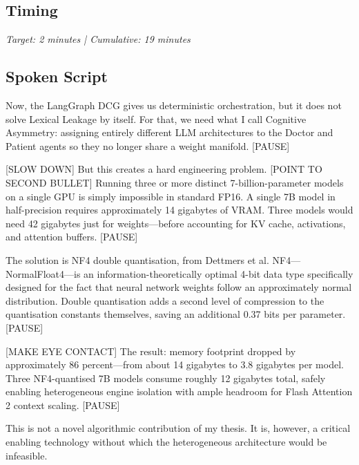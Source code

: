 \documentclass[12pt]{article}
\begin{document}
  \subsection*{Timing}
  \textit{Target: 2 minutes | Cumulative: 19 minutes}

  \subsection*{Spoken Script}
  \begin{spokenbox}
   Now, the LangGraph DCG gives us deterministic orchestration, but it does not solve Lexical Leakage by itself. For that, we need what I call Cognitive Asymmetry: assigning entirely different LLM architectures to the Doctor and Patient agents so they no longer share a weight manifold. [PAUSE]

  [SLOW DOWN] But this creates a hard engineering problem. [POINT TO SECOND BULLET] Running three or more distinct 7-billion-parameter models on a single GPU is simply impossible in standard FP16. A single 7B model in half-precision requires approximately 14 gigabytes of VRAM. Three models would need 42 gigabytes just for weights---before accounting for KV cache, activations, and attention buffers. [PAUSE]

  The solution is NF4 double quantisation, from Dettmers et al. NF4---NormalFloat4---is an information-theoretically optimal 4-bit data type specifically designed for the fact that neural network weights follow an approximately normal distribution. Double quantisation adds a second level of compression to the quantisation constants themselves, saving an additional 0.37 bits per parameter. [PAUSE]

  [MAKE EYE CONTACT] The result: memory footprint dropped by approximately 86 percent---from about 14 gigabytes to 3.8 gigabytes per model. Three NF4-quantised 7B models consume roughly 12 gigabytes total, safely enabling heterogeneous engine isolation with ample headroom for Flash Attention 2 context scaling. [PAUSE]

  This is not a novel algorithmic contribution of my thesis. It is, however, a critical enabling technology without which the heterogeneous architecture would be infeasible.
  \end{spokenbox}
\end{document}
